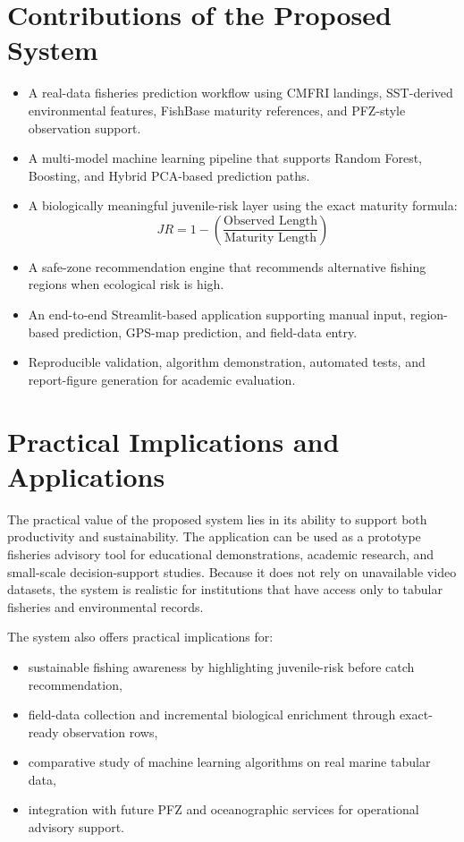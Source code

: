 \documentclass[12pt,a4paper]{report}
\begin{document}
\section{Contributions of the Proposed System}
\begin{itemize}[leftmargin=1.5cm]
    \item A real-data fisheries prediction workflow using CMFRI landings, SST-derived environmental features, FishBase maturity references, and PFZ-style observation support.
    \item A multi-model machine learning pipeline that supports Random Forest, Boosting, and Hybrid PCA-based prediction paths.
    \item A biologically meaningful juvenile-risk layer using the exact maturity formula:
    \[
    JR = 1 - \left(\frac{\text{Observed Length}}{\text{Maturity Length}}\right)
    \]
    \item A safe-zone recommendation engine that recommends alternative fishing regions when ecological risk is high.
    \item An end-to-end Streamlit-based application supporting manual input, region-based prediction, GPS-map prediction, and field-data entry.
    \item Reproducible validation, algorithm demonstration, automated tests, and report-figure generation for academic evaluation.
\end{itemize}

\section{Practical Implications and Applications}
The practical value of the proposed system lies in its ability to support both productivity and sustainability. The application can be used as a prototype fisheries advisory tool for educational demonstrations, academic research, and small-scale decision-support studies. Because it does not rely on unavailable video datasets, the system is realistic for institutions that have access only to tabular fisheries and environmental records.

The system also offers practical implications for:
\begin{itemize}[leftmargin=1.5cm]
    \item sustainable fishing awareness by highlighting juvenile-risk before catch recommendation,
    \item field-data collection and incremental biological enrichment through exact-ready observation rows,
    \item comparative study of machine learning algorithms on real marine tabular data,
    \item integration with future PFZ and oceanographic services for operational advisory support.
\end{itemize}
\end{document}

